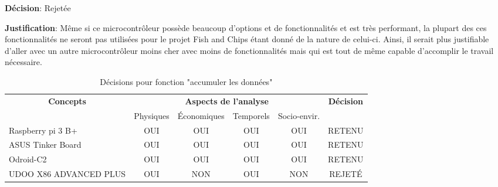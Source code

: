 \textbf{Décision}: Rejetée

\textbf{Justification}: Même si ce microcontrôleur possède beaucoup d’options et de fonctionnalités et est très performant, la plupart des ces fonctionnalités ne seront pas utilisées pour le projet Fish and Chips étant donné de la nature de celui-ci. Ainsi, il serait plus justifiable d’aller avec un autre microcontrôleur moins cher avec moins de fonctionnalités mais qui est tout de même capable d’accomplir le travail nécessaire.

\begin{table}[!htbp]
	\begin{tabular}{|l|c|c|c|c|c|}
	\hline
	\multicolumn{1}{|c|}{\multirow{2}{*}{\textbf{Concepts}}} & \multicolumn{4}{c|}{\textbf{Aspects de l'analyse}} & \multirow{2}{*}{\textbf{Décision}} \\ \cline{2-5}
	\multicolumn{1}{|c|}{}                                   & Physiques & Économiques & Temporels & Socio-envir. &                                    \\ \hline
	Raspberry pi 3 B+                                                 & OUI       & OUI         & OUI       & OUI          & RETENU                             \\ \hline
	ASUS Tinker Board                                               & OUI       & OUI         & OUI       & OUI          & RETENU                             \\ \hline
	Odroid-C2                                                 & OUI       & OUI         & OUI       & OUI          & RETENU                             \\ \hline
	UDOO X86 ADVANCED PLUS                                               & OUI       & NON         & OUI       & NON         & REJETÉ	        \\ \hline
	\end{tabular}
	\caption{Décisions pour fonction "accumuler les données"}
	\label{tab:fct_acceder}
\end{table}
